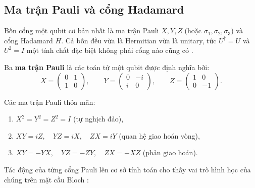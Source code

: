 \subsection*{Ma trận Pauli và cổng Hadamard}

Bốn cổng một qubit cơ bản nhất là ma trận Pauli $X, Y, Z$ (hoặc $\sigma_1, \sigma_2, \sigma_3$) và cổng Hadamard $H$.
Cả bốn đều vừa là Hermitian vừa là unitary, tức $U^\dagger = U$ và $U^2 = I$
một tính chất đặc biệt không phải cổng nào cũng có \cite{ref5}.

\begin{definition}
\label{def:pauli}
Ba \textbf{ma trận Pauli} là các toán tử một qubit được định nghĩa bởi:
$$X = \begin{pmatrix}0&1\\1&0\end{pmatrix}, \qquad
  Y = \begin{pmatrix}0&-i\\i&0\end{pmatrix}, \qquad
  Z = \begin{pmatrix}1&0\\0&-1\end{pmatrix}.$$
\end{definition}

\begin{proposition}
\label{prop:pauli}
Các ma trận Pauli thỏa mãn:
\begin{enumerate}[label=(\roman*)]
    \item $X^2 = Y^2 = Z^2 = I$ \quad (tự nghịch đảo),
    \item $XY = iZ,\quad YZ = iX,\quad ZX = iY$ \quad (quan hệ giao hoán vòng),
    \item $XY = -YX,\quad YZ = -ZY,\quad ZX = -XZ$ \quad (phản giao hoán).
\end{enumerate}
\end{proposition}

Tác động của từng cổng Pauli lên cơ sở tính toán cho thấy vai trò hình học của
chúng trên mặt cầu Bloch \cite{ref5}:

